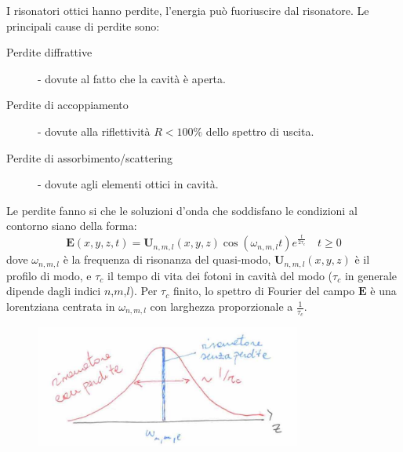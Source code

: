 \documentclass{book}
\def \*#1{\mathbf{#1}}
\theoremstyle{remark}
\begin{document}
I risonatori ottici hanno perdite, l'energia può fuoriuscire dal risonatore. Le principali cause di perdite sono:
\begin{description}
\item [Perdite diffrattive] - dovute al fatto che la cavità è aperta.
\item [Perdite di accoppiamento] - dovute alla riflettività $R < 100\%$ dello spettro di uscita.
\item [Perdite di assorbimento/scattering] - dovute agli elementi ottici in cavità.
\end{description}
Le perdite fanno si che le soluzioni d'onda che soddisfano le condizioni al contorno siano della forma:
\begin{equation*}
\*E(x,y,z,t) = \*U_{n,m,l}(x,y,z) \cos(\omega_{n,m,l} t) e^{\frac{t}{2\tau_c}} \quad t \geq 0
\end{equation*}
dove $\omega_{n,m,l}$ è la frequenza di risonanza del quasi-modo, $\*U_{n,m,l}(x,y,z)$ è il profilo di modo, e $\tau_c$ il tempo di vita dei fotoni in cavità del modo ($\tau_c$ in generale dipende dagli indici $n$,$m$,$l$).
Per $\tau_c$ finito, lo spettro di Fourier del campo $\*E$ è una lorentziana centrata in $\omega_{n,m,l}$ con larghezza proporzionale a $\frac{1}{\tau_c}$.
\begin{figure}[H]
\centering
\includegraphics[height=4cm]{images/10}
\end{figure}
\noindent
\end{document}
